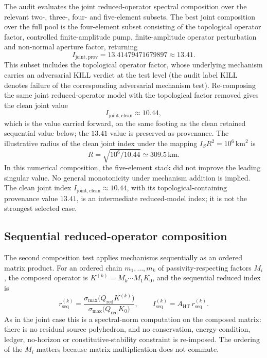 \documentclass[11pt,a4paper]{article}
\begin{document}
The audit evaluates the joint reduced-operator spectral composition over the relevant two-, three-, four- and five-element subsets. The best joint composition over the full pool is the four-element subset consisting of the topological operator factor, controlled finite-amplitude pump, finite-amplitude operator perturbation and non-normal aperture factor, returning
\[
I_{\mathrm{joint,prov}} = 13.41479471679897 \approx 13.41.
\]
This subset includes the topological operator factor, whose underlying mechanism carries an adversarial KILL verdict at the test level (the audit label \textsc{KILL} denotes failure of the corresponding adversarial mechanism test). Re-composing the same joint reduced-operator model with the topological factor removed gives the clean joint value
\[
I_{\mathrm{joint,clean}} \approx 10.44,
\]
which is the value carried forward, on the same footing as the clean retained sequential value below; the $13.41$ value is preserved as provenance. The illustrative radius of the clean joint index under the mapping $I_{S}R^{2}=10^{6}\,\mathrm{km}^{2}$ is
\[
R = \sqrt{10^{6}/10.44} \simeq 309.5\,\mathrm{km}.
\]
In this numerical composition, the five-element stack did not improve the leading singular value. No general monotonicity under mechanism addition is implied. The clean joint index $I_{\mathrm{joint,clean}}\approx10.44$, with its topological-containing provenance value $13.41$, is an intermediate reduced-model index; it is not the strongest selected case.

\subsection{Sequential reduced-operator composition}

The second composition test applies mechanisms sequentially as an ordered matrix product. For an ordered chain $m_{1},\ldots,m_{k}$ of passivity-respecting factors $M_{i}$, the composed operator is $K^{(k)}=M_{k}\cdots M_{1}K_{0}$, and the sequential reduced index is
\[
r_{\mathrm{seq}}^{(k)} = \frac{\sigma_{\max}\!\bigl(Q_{\mathrm{red}}K^{(k)}\bigr)}{\sigma_{\max}\!\bigl(Q_{\mathrm{red}}K_{0}\bigr)},
\qquad
I_{\mathrm{seq}}^{(k)} = A_{\mathrm{HT}}\,r_{\mathrm{seq}}^{(k)}.
\]
As in the joint case this is a spectral-norm computation on the composed matrix: there is no residual source polyhedron, and no conservation, energy-condition, ledger, no-horizon or constitutive-stability constraint is re-imposed. The ordering of the $M_{i}$ matters because matrix multiplication does not commute.
\end{document}
